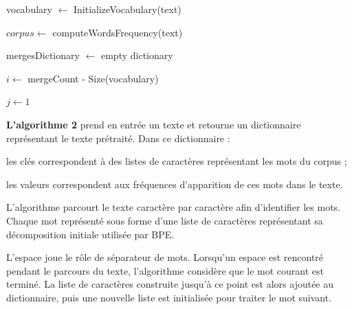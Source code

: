 \documentclass[12pt,a4paper]{report}
\begin{document}
\begin{algorithm}[H]
	\caption{TrainBPE}
	
	vocabulary $\leftarrow$ InitializeVocabulary(text)\;
	
	$corpus \leftarrow$ computeWordsFrequency(text)\;
	
	mergesDictionary $\leftarrow$ empty dictionary\;
	
	$i \leftarrow$ mergeCount - Size(vocabulary)\;
		
	$j \leftarrow 1$\;
		
\end{algorithm}

\vspace{0.5cm}

\textbf{L’algorithme 2} prend en entrée un texte et retourne un dictionnaire représentant le texte prétraité. Dans ce dictionnaire :

\begin{itemizeFB}
	\item les clés correspondent à des listes de caractères représentant les mots du corpus ;
	\item les valeurs correspondent aux fréquences d’apparition de ces mots dans le texte.
\end{itemizeFB}

L’algorithme parcourt le texte caractère par caractère afin d’identifier les mots. Chaque mot représenté sous forme d’une liste de caractères représentant sa décomposition initiale utilisée par BPE.

L’espace joue le rôle de séparateur de mots. Lorsqu’un espace est rencontré pendant le parcours du texte, l’algorithme considère que le mot courant est terminé. La liste de caractères construite jusqu’à ce point est alors ajoutée au dictionnaire, puis une nouvelle liste est initialisée pour traiter le mot suivant.
\end{document}
